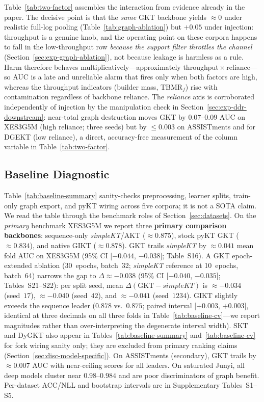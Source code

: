 \documentclass[pdflatex,sn-mathphys-num]{sn-jnl}
\newcommand{\GKTdeltaci}{[$-0.044$, $-0.038$]}
\newcommand{\GKTthirtydeltavec}{-0.038}
\newcommand{\GKTthirtydeltaci}{[$-0.040$, $-0.035$]}
\newcommand{\GIKTdeltaci}{[$+0.003$, $+0.003$]}
\newenvironment{revbox}{}{}
\begin{document}
\begin{revbox}
Table~\ref{tab:two-factor} assembles the interaction from evidence already in
the paper. The decisive point is that the \emph{same} GKT backbone yields
${\approx}0$ under realistic full-log pooling (Table~\ref{tab:graph-ablation})
but $+0.05$ under injection: throughput is a genuine knob, and the operating
point on these corpora happens to fall in the low-throughput row \emph{because
the support filter throttles the channel} (Section~\ref{sec:exp-graph-ablation}),
not because leakage is harmless as a rule. Harm therefore behaves
multiplicatively---approximately throughput\,$\times$\,reliance---so AUC is a
late and unreliable alarm that fires only when both factors are high, whereas
the throughput indicators (builder mass, $\mathrm{TBMR}_f$) rise with
contamination regardless of backbone reliance. The \emph{reliance} axis is
corroborated independently of injection by the manipulation check in
Section~\ref{sec:exp-ddr-downstream}: near-total graph destruction moves GKT by
$0.07$--$0.09$ AUC on XES3G5M (high reliance; three seeds) but by ${\le}0.003$ on
ASSISTments and for DGEKT (low reliance), a direct, accuracy-free measurement of
the column variable in Table~\ref{tab:two-factor}.
\end{revbox}

\subsection{Baseline Diagnostic}
\label{sec:exp-baseline}

Table~\ref{tab:baseline-summary} sanity-checks preprocessing, learner splits,
train-only graph export, and pyKT wiring across five corpora; it is not a SOTA
claim. We read the table through the benchmark roles of Section~\ref{sec:datasets}.
On the \emph{primary} benchmark XES3G5M we report three \textbf{primary
comparison backbones}: sequence-only \textit{simpleKT}/AKT (${\approx}0.875$),
stock pyKT GKT (${\approx}0.834$), and native GIKT (${\approx}0.878$).
GKT trails \textit{simpleKT} by ${\approx}0.041$ mean fold AUC on XES3G5M
(95\% CI \GKTdeltaci{}; Table~S16). A GKT epoch-extended ablation (30~epochs,
batch~32; \textit{simpleKT} reference at 10~epochs, batch~64) narrows the gap to
$\Delta{\approx}\GKTthirtydeltavec{}$ (95\% CI \GKTthirtydeltaci{};
Tables~S21--S22): per split seed, mean $\Delta(\text{GKT}-\textit{simpleKT})$
is ${\approx}{-}0.034$ (seed~$17$), ${\approx}{-}0.040$ (seed~$42$), and
${\approx}{-}0.041$ (seed~$1234$). GIKT slightly exceeds the sequence leader
($0.878$ vs.\ $0.875$; paired interval \GIKTdeltaci{}, identical at three
decimals on all three folds in Table~\ref{tab:baseline-cv}---we report
magnitudes rather than over-interpreting the degenerate interval width).
SKT and DyGKT also appear in Tables~\ref{tab:baseline-summary}
and~\ref{tab:baseline-cv} for fork wiring sanity only; they are excluded from
primary ranking claims (Section~\ref{sec:disc-model-specific}).
On ASSISTments (secondary), GKT trails by ${\approx}0.007$ AUC with
near-ceiling scores for all leaders. On saturated Junyi, all deep models
cluster near $0.98$--$0.984$ and are poor discriminators of graph benefit.
Per-dataset ACC/NLL and bootstrap intervals are in Supplementary Tables~S1--S5.
\end{document}
